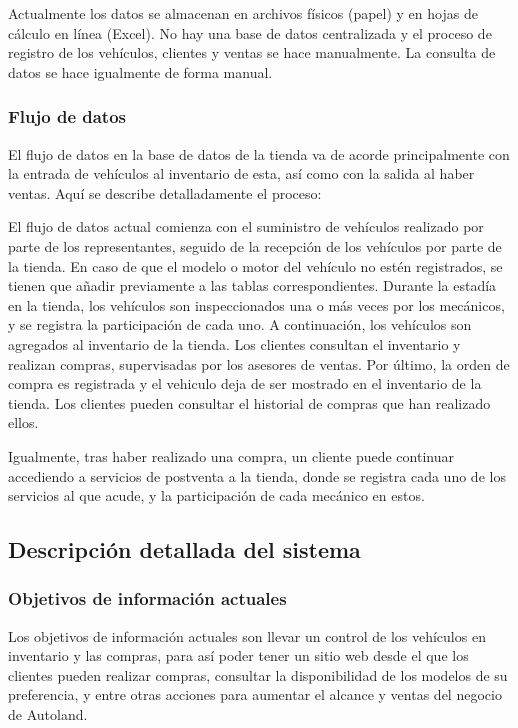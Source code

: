 \documentclass[12pt]{article}
\begin{document}
Actualmente los datos se almacenan en archivos físicos (papel) y en hojas de cálculo en línea (Excel). No hay una base de datos centralizada y el proceso de registro de los vehículos, clientes y ventas se hace manualmente. La consulta de datos se hace igualmente de forma manual.

\subsubsection{Flujo de datos}

El flujo de datos en la base de datos de la tienda va de acorde principalmente con la entrada de vehículos al inventario de esta, así como con la salida al haber ventas. Aquí se describe detalladamente el proceso:

El flujo de datos actual comienza con el suministro de vehículos realizado por parte de los representantes, seguido de la recepción de los vehículos por parte de la tienda. En caso de que el modelo o motor del vehículo no estén registrados, se tienen que añadir previamente a las tablas correspondientes. Durante la estadía en la tienda, los vehículos son inspeccionados una o más veces por los mecánicos, y se registra la participación de cada uno. A continuación, los vehículos son agregados al inventario de la tienda. Los clientes consultan el inventario y realizan compras, supervisadas por los asesores de ventas. Por último, la orden de compra es registrada y el vehiculo deja de ser mostrado en el inventario de la tienda. Los clientes pueden consultar el historial de compras que han realizado ellos.

Igualmente, tras haber realizado una compra, un cliente puede continuar accediendo a servicios de postventa a la tienda, donde se registra cada uno de los servicios al que acude, y la participación de cada mecánico en estos.

\subsection{Descripci\'on detallada del sistema}

\subsubsection{Objetivos de información actuales}

Los objetivos de información actuales son llevar un control de los vehículos en inventario y las compras, para así poder tener un sitio web desde el que los clientes pueden realizar compras, consultar la disponibilidad de los modelos de su preferencia, y entre otras acciones para aumentar el alcance y ventas del negocio de Autoland.
\end{document}
